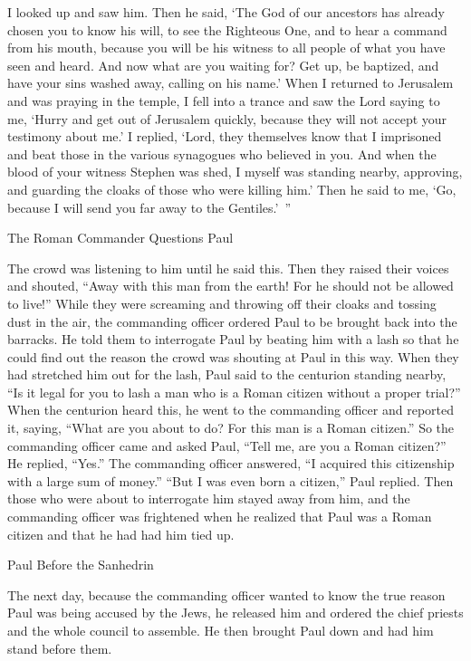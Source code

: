 {I looked up and saw
him.
Then
he said,
‘The God
of our
ancestors
has already chosen
you
to know
his
will,
to see
the Righteous One,
and
to hear
a command
from
his
mouth,
because
you will be
his
witness
to
all
people
of what
you have seen
and
heard.
And
now
what
are you waiting for? Get up,
be baptized,
and
have your
sins
washed away,
calling on
his
name.’
When
I
returned
to
Jerusalem
and
was praying
in
the temple,
I
fell
into
a trance
and
saw
the Lord
saying
to me,
‘Hurry
and
get out
of
Jerusalem
quickly,
because
they will
not
accept
your
testimony
about
me.’
I
replied, ‘Lord,
they
themselves
know
that
I
imprisoned
and
beat
those in the various
synagogues
who believed
in
you.
And
when
the blood
of your
witness
Stephen
was shed,
I
myself
was
standing nearby,
approving,
and
guarding
the cloaks
of those who were killing
him.’
Then
he said
to
me,
‘Go,
because
I
will send
you
far
away
to
the Gentiles.’ ”
\par }{\SH The Roman Commander Questions Paul
\par }{\PP {}The crowd was listening
to him
until
he said this.
Then
they raised
their
voices
and shouted, “Away
with this man
from
the earth! For
he
should
not
be allowed
to live!”
While
they
were screaming
and
throwing off
their cloaks
and
tossing
dust
in
the air,
the commanding officer
ordered
Paul
to be brought back
into
the barracks.
He told
them to interrogate
Paul by beating
him
with a lash
so that
he could find out
the reason
the crowd was shouting
at Paul in this way.
When
they had stretched
him
out
for the lash,
Paul
said
to
the centurion
standing nearby,
“Is it legal
for you
to lash
a man
who is a Roman citizen
without a proper trial?”
When
the centurion
heard
this, he went
to the commanding officer
and reported
it, saying,
“What
are you about
to do? For
this
man
is
a Roman citizen.”
So
the commanding officer
came
and asked
Paul, “Tell
me,
are you
a Roman citizen?” He replied, “Yes.”
The commanding officer
answered,
“I
acquired
this
citizenship
with a large
sum of money.” “But
I
was even born
a citizen,” Paul
replied.
Then
those who were about
to interrogate
him stayed away
from
him,
and
the commanding officer
was frightened
when
he realized
that
Paul was
a Roman citizen
and
that
he had had
him
tied up.
\par }{\SH Paul Before the Sanhedrin
\par }{\PP {}The next day,
because the commanding officer wanted
to know
the true reason
Paul was being accused
by
the Jews,
he released
him
and
ordered
the chief priests
and
the whole
council
to assemble.
He then
brought
Paul
down
and had
him stand
before
them.

}
